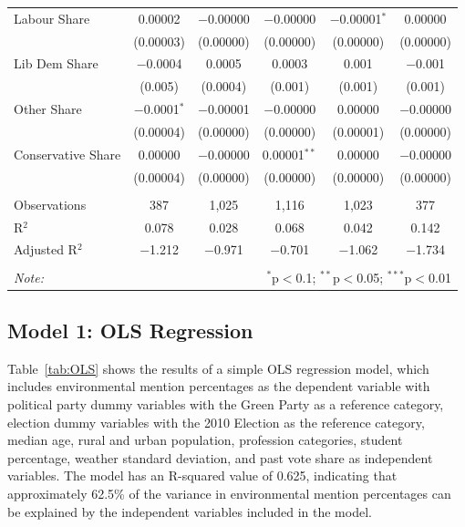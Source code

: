 \documentclass[preprint,12pt,authoryear]{elsarticle}
\begin{document}
\begin{table}[!htbp]
\begin{tabular}{@{\extracolsep{6pt}}lccccc}
Labour Share & 0.00002 & $-$0.00000 & $-$0.00000 & $-$0.00001$^{*}$ & 0.00000 \\ 
	& (0.00003) & (0.00000) & (0.00000) & (0.00000) & (0.00000) \\
Lib Dem Share & $-$0.0004 & 0.0005 & 0.0003 & 0.001 & $-$0.001 \\
	& (0.005) & (0.0004) & (0.001) & (0.001) & (0.001) \\
Other Share & $-$0.0001$^{*}$ & $-$0.00001 & $-$0.00000 & 0.00000 & $-$0.00000 \\
	& (0.00004) & (0.00000) & (0.00000) & (0.00001) & (0.00000) \\ 
Conservative Share & 0.00000 & $-$0.00000 & 0.00001$^{**}$ & 0.00000 & $-$0.00000 \\
	& (0.00004) & (0.00000) & (0.00000) & (0.00000) & (0.00000) \\
 \hline \\[-1.8ex]
Observations & 387 & 1,025 & 1,116 & 1,023 & 377 \\ 
R$^{2}$ & 0.078 & 0.028 & 0.068 & 0.042 & 0.142 \\
Adjusted R$^{2}$ & $-$1.212 & $-$0.971 & $-$0.701 & $-$1.062 & $-$1.734 \\
\hline
\hline \\[-1.8ex]
\textit{Note:}  & \multicolumn{5}{r}{$^{*}$p$<$0.1; $^{**}$p$<$0.05; $^{***}$p$<$0.01} \\
\end{tabular}
\end{table} 



\subsection{Model 1: OLS Regression}



Table~\ref{tab:OLS} shows the results of a simple OLS regression model, which includes environmental mention percentages as the dependent variable with political party dummy variables with the Green Party as a reference category, election dummy variables with the 2010 Election as the reference category, median age, rural and urban population, profession categories, student percentage, weather standard deviation, and past vote share as independent variables. The model has an R-squared value of 0.625, indicating that approximately 62.5\% of the variance in environmental mention percentages can be explained by the independent variables included in the model.
\end{document}
